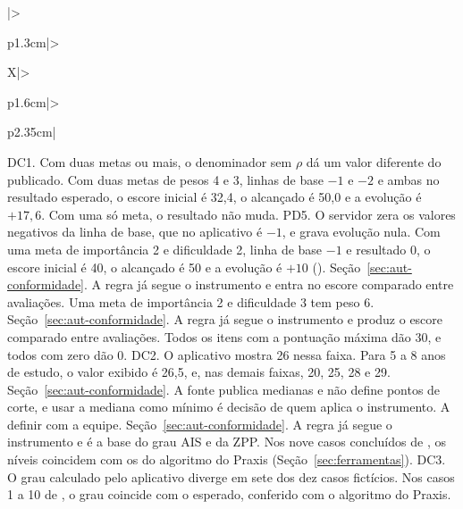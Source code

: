 \begin{apendicesenv}
{\begin{xltabular}{\textwidth}{|>{\raggedright\arraybackslash}p{1.3cm}|>{\raggedright\arraybackslash}X|>{\raggedright\arraybackslash}p{1.6cm}|>{\raggedright\arraybackslash}p{2.35cm}|}
		{DC1.}
		{Com duas metas ou mais, o denominador sem $\rho$ dá um valor diferente do publicado.}
		{Com duas metas de pesos 4 e 3, linhas de base $-1$ e $-2$ e ambas no resultado esperado, o escore inicial é
		32,4, o alcançado é 50,0 e a evolução é $+17{,}6$. Com uma só meta, o resultado não muda.}
		{PD5.}
		{O servidor zera os valores negativos da linha de base, que no aplicativo é $-1$, e grava evolução nula.}
		{Com uma meta de importância 2 e dificuldade 2, linha de base $-1$ e resultado 0, o escore inicial é 40, o
		alcançado é 50 e a evolução é $+10$ ().}
		{Seção~\ref{sec:aut-conformidade}.}
		{A regra já segue o instrumento e entra no escore comparado entre avaliações.}
		{Uma meta de importância 2 e dificuldade 3 tem peso 6.}
		{Seção~\ref{sec:aut-conformidade}.}
		{A regra já segue o instrumento e produz o escore comparado entre avaliações.}
		{Todos os itens com a pontuação máxima dão 30, e todos com zero dão 0.}
		{DC2.}
		{O aplicativo mostra 26 nessa faixa.}
		{Para 5 a 8 anos de estudo, o valor exibido é 26,5, e, nas demais faixas, 20, 25, 28 e 29.}
		{Seção~\ref{sec:aut-conformidade}.}
		{A fonte publica medianas e não define pontos de corte, e usar a mediana como mínimo é decisão de quem aplica
		o instrumento.}
		{A definir com a equipe.}
		{Seção~\ref{sec:aut-conformidade}.}
		{A regra já segue o instrumento e é a base do grau AIS e da ZPP.}
		{Nos nove casos concluídos de , os níveis coincidem com os do
		algoritmo do Praxis (Seção~\ref{sec:ferramentas}).}
		{DC3.}
		{O grau calculado pelo aplicativo diverge em sete dos dez casos fictícios.}
		{Nos casos 1 a 10 de , o grau coincide com o esperado, conferido com o
		algoritmo do Praxis.}

\end{xltabular}}
\end{apendicesenv}
